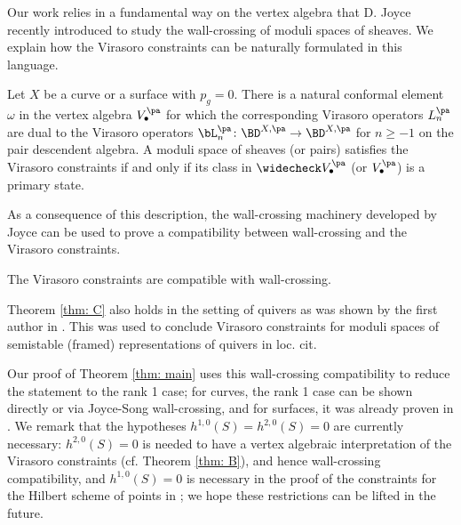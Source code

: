 Our work relies in a fundamental way on the vertex algebra that D. Joyce recently introduced \cite{Jo17,GJT,Jo21} to study the wall-crossing of moduli spaces of sheaves. We explain how the Virasoro constraints can be naturally formulated in this language.

\begin{thm}[=Theorem \ref{thm: duality} and Theorem \ref{thm: virasorophysical}]
\notready\label{thm: B}
Let $X$ be a curve or a surface with $p_g=0$. There is a natural conformal element $\omega$ in the vertex algebra $V_\bullet^{\pa}$ for which the corresponding Virasoro operators $L_n^{\pa}$ are dual to the Virasoro operators $\bL_n^{\pa}\colon \BD^{X,\pa}\to \BD^{X,\pa}$ for $n\geq -1$ on the pair descendent algebra. A moduli space of sheaves (or pairs) satisfies the Virasoro constraints if and only if its class in $\widecheck V_\bullet^{\pa}$ (or $V_\bullet^{\pa}$) is a primary state.
\end{thm}


As a consequence of this description, the wall-crossing machinery developed by Joyce can be used to prove a compatibility between wall-crossing and the Virasoro constraints.
\begin{thm}[=Propositions \ref{prop: wallcrossingcompatibility1} and \ref{prop: wallcrossingcompatibility2}]
\notready\label{thm: C}
The Virasoro constraints are compatible with wall-crossing.
\end{thm}
Theorem \ref{thm: C} also holds in the setting of quivers as was shown by the first author in \cite[Theorem 1.2]{BoVir}. This was used to conclude Virasoro constraints for moduli spaces of semistable (framed) representations of quivers in loc. cit.

Our proof of Theorem \ref{thm: main} uses this wall-crossing compatibility to reduce the statement to the rank 1 case; for curves, the rank 1 case can be shown directly or via Joyce-Song wall-crossing, and for surfaces, it was already proven in \cite{moop,moreira}. We remark that the hypotheses $h^{1,0}(S)=h^{2,0}(S)=0$ are currently necessary: $h^{2,0}(S)=0$ is needed to have a vertex algebraic interpretation of the Virasoro constraints (cf. Theorem \ref{thm: B}), and hence wall-crossing compatibility, and $h^{1,0}(S)=0$ is necessary in the proof of the constraints for the Hilbert scheme of points in \cite{moreira}; we hope these restrictions can be lifted in the future.


